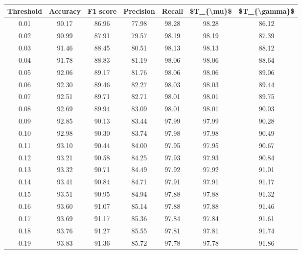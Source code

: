 \begin{tabular}{|c|c|c|c|c|c|c|}
\hline
 Threshold &  Accuracy &  F1 score &  Precision &  Recall &  \$T\_\{\textbackslash mu\}\$ &  \$T\_\{\textbackslash gamma\}\$ \\
\hline
      0.01 &     90.17 &     86.96 &      77.98 &   98.28 &      98.28 &         86.12 \\
      0.02 &     90.99 &     87.91 &      79.57 &   98.19 &      98.19 &         87.39 \\
      0.03 &     91.46 &     88.45 &      80.51 &   98.13 &      98.13 &         88.12 \\
      0.04 &     91.78 &     88.83 &      81.19 &   98.06 &      98.06 &         88.64 \\
      0.05 &     92.06 &     89.17 &      81.76 &   98.06 &      98.06 &         89.06 \\
      0.06 &     92.30 &     89.46 &      82.27 &   98.03 &      98.03 &         89.44 \\
      0.07 &     92.51 &     89.71 &      82.71 &   98.01 &      98.01 &         89.75 \\
      0.08 &     92.69 &     89.94 &      83.09 &   98.01 &      98.01 &         90.03 \\
      0.09 &     92.85 &     90.13 &      83.44 &   97.99 &      97.99 &         90.28 \\
      0.10 &     92.98 &     90.30 &      83.74 &   97.98 &      97.98 &         90.49 \\
      0.11 &     93.10 &     90.44 &      84.00 &   97.95 &      97.95 &         90.67 \\
      0.12 &     93.21 &     90.58 &      84.25 &   97.93 &      97.93 &         90.84 \\
      0.13 &     93.32 &     90.71 &      84.49 &   97.92 &      97.92 &         91.01 \\
      0.14 &     93.41 &     90.84 &      84.71 &   97.91 &      97.91 &         91.17 \\
      0.15 &     93.51 &     90.95 &      84.94 &   97.88 &      97.88 &         91.32 \\
      0.16 &     93.60 &     91.07 &      85.14 &   97.88 &      97.88 &         91.46 \\
      0.17 &     93.69 &     91.17 &      85.36 &   97.84 &      97.84 &         91.61 \\
      0.18 &     93.76 &     91.27 &      85.55 &   97.81 &      97.81 &         91.74 \\
      0.19 &     93.83 &     91.36 &      85.72 &   97.78 &      97.78 &         91.86 \\

\end{tabular}
